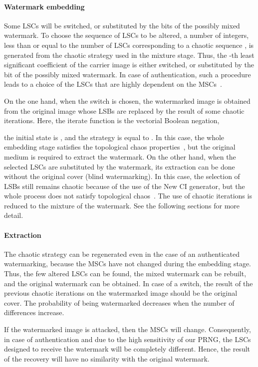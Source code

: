 \documentclass[journal]{IEEEtran}
\begin{document}
\paragraph{Watermark embedding}

Some LSCs will be switched, or substituted by the bits of the possibly mixed watermark. To choose the sequence of LSCs to be altered, a number of integers, less than or equal to the number  of LSCs corresponding to a chaotic sequence , is generated from the chaotic strategy used in the mixture stage. Thus, the -th least significant coefficient of the carrier image is either switched, or substituted by the  bit of the possibly mixed watermark. In case of authentication, such a procedure leads to a choice of the LSCs that are highly dependent on the MSCs~\cite{guyeux10}.

On the one hand, when the switch is chosen, the watermarked image is obtained from the original image whose LSBs  are replaced by the result of some chaotic iterations. Here, the iterate function is the vectorial Boolean negation,

the initial state is , and the strategy is equal to . In this case, the whole embedding stage satisfies the topological chaos properties~\cite{guyeux10}, but the original medium is required to extract the watermark. On the other hand, when the selected LSCs are substituted by the watermark, its extraction can be done without the original cover (blind watermarking). In this case, the selection of LSBs still remains chaotic because of the use of the New CI generator, but the whole process does not satisfy topological chaos~\cite{guyeux10}. The use of chaotic iterations is reduced to the mixture of the watermark. See the following sections for more detail.

\paragraph{Extraction}

The chaotic strategy can be regenerated even in the case of an authenticated watermarking, because the MSCs have not changed during the embedding stage. Thus, the few altered LSCs can be found, the mixed watermark can be rebuilt, and the original watermark can be obtained. In case of a switch, the result of the previous chaotic iterations on the watermarked image should be the original cover. The probability of being watermarked decreases when the number of differences increase.

If the watermarked image is attacked, then the MSCs will change. Consequently, in case of authentication and due to the high sensitivity of our PRNG, the LSCs designed to receive the watermark will be completely different. Hence, the result of the recovery will have no similarity with the original watermark.
\end{document}

